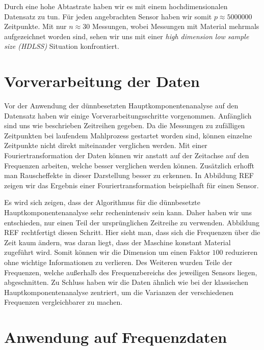Durch eine hohe Abtastrate haben wir es mit einem hochdimensionalen Datensatz zu tun. Für jeden angebrachten Sensor haben wir somit $p \approx 5000000$ Zeitpunkte. Mit nur $n \approx 30$ Messungen, wobei Messungen mit Material mehrmals aufgezeichnet worden sind, sehen wir uns mit einer \textit{high dimension low sample size (HDLSS)} Situation konfrontiert. 

\section{Vorverarbeitung der Daten}
\label{preprocessing}

Vor der Anwendung der dünnbesetzten Hauptkomponentenanalyse auf den Datensatz haben wir einige Vorverarbeitungsschritte vorgenommen. Anfänglich sind uns wie beschrieben Zeitreihen gegeben. Da die Messungen zu zufälligen Zeitpunkten bei laufendem Mahlprozess gestartet worden sind, können einzelne Zeitpunkte nicht direkt miteinander verglichen werden. Mit einer Fouriertransformation der Daten können wir anstatt auf der Zeitachse auf den Frequenzen arbeiten, welche besser verglichen werden können. Zusätzlich erhofft man Rauscheffekte in dieser Darstellung besser zu erkennen. In Abbildung REF zeigen wir das Ergebnis einer Fouriertransformation beispielhaft für einen Sensor.

Es wird sich zeigen, dass der Algorithmus für die dünnbesetzte Hauptkomponentenanalyse sehr rechenintensiv sein kann. Daher haben wir uns entschieden, nur einen Teil der ursprünglichen Zeitreihe zu verwenden. Abbildung REF rechtfertigt diesen Schritt. Hier sieht man, dass sich die Frequenzen über die Zeit kaum ändern, was daran liegt, dass der Maschine konstant Material zugeführt wird. Somit können wir die Dimension um einen Faktor $100$ reduzieren ohne wichtige Informationen zu verlieren. Des Weiteren wurden Teile der Frequenzen, welche außerhalb des Frequenzbereichs des jeweiligen Sensors liegen, abgeschnitten. Zu Schluss haben wir die Daten ähnlich wie bei der klassischen Hauptkomponentenanalyse zentriert, um die Varianzen der verschiedenen Frequenzen vergleichbarer zu machen.




\section{Anwendung auf Frequenzdaten}
\label{application_frequency_data}


